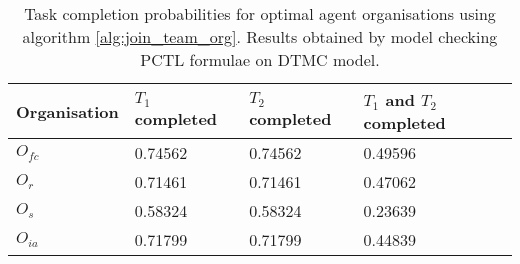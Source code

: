 \documentclass{llncs}
\begin{document}
\begin{table}
\caption{Model checking results for agent organisations from figure \ref{fig:network_configurations} with optimal resource allocations from table \ref{tab:optimal_r}. Tables also show largest and smallest individual agent rewards. }
\end{table}


\begin{table}
 \centering
 \begin{tabular}{ | l | l | l | l |}
    \hline
    Organisation & $T_1$ completed & $T_2$ completed & $T_1$ and $T_2$ completed \\ \hline
    $O_{fc}$ & 0.74562 & 0.74562 & 0.49596  \\ \hline
    $O_r$ & 0.71461 & 0.71461 & 0.47062 \\ \hline
    $O_s$ & 0.58324 & 0.58324 & 0.23639 \\ \hline
    $O_{ia}$ & 0.71799 & 0.71799 & 0.44839 \\ \hline
\end{tabular}

\caption{Task completion probabilities for optimal agent organisations using algorithm \ref{alg:join_team_org}. Results obtained by model checking PCTL formulae on DTMC model.}
\end{table}
\end{document}
